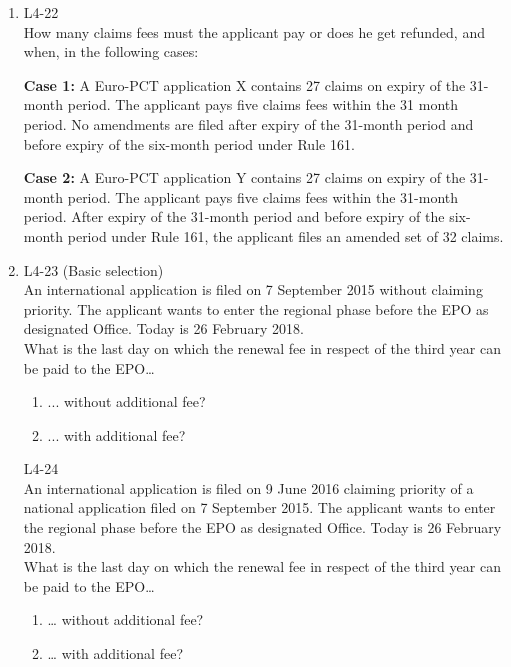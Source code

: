 \documentclass{report}
\begin{document}
\begin{enumerate}[label=\textbf{Answer \arabic*}]
\begin{enumerate}[label=\textbf{Answer \arabic*}]
    \item %
    L4-22 \\
    How many claims fees must the applicant pay or does he get refunded, and when, in the following cases:
    
    \vspace{1em}
    \textbf{Case 1:} A Euro-PCT application X contains 27 claims on expiry of the 31-month period. The applicant pays five claims fees within the 31 month period. No amendments are filed after expiry of the 31-month period and before expiry of the six-month period under Rule 161.
    
    \vspace{1em}
    \textbf{Case 2:} A Euro-PCT application Y contains 27 claims on expiry of the 31-month period. The applicant pays five claims fees within the 31-month period. After expiry of the 31-month period and before expiry of the six-month period under Rule 161, the applicant files an amended set of 32 claims.

    \item %
    L4-23 (Basic selection) \\
    An international application is filed on 7 September 2015 without claiming priority. The applicant wants to enter the regional phase before the EPO as designated Office. Today is 26 February 2018. \\
    What is the last day on which the renewal fee in respect of the third year can be paid to the EPO…
    \begin{enumerate}[label=(\alph*)]
        \item ... without additional fee?
        \item ... with additional fee?
    \end{enumerate}

    \vspace{1em}
    L4-24 \\
    An international application is filed on 9 June 2016 claiming priority of a national application filed on 7 September 2015. The applicant wants to enter the regional phase before the EPO as designated Office. Today is 26 February 2018. \\
    What is the last day on which the renewal fee in respect of the third year can be paid to the EPO…
    \begin{enumerate}[label=(\alph*), resume]
        \item … without additional fee?
        \item … with additional fee?
    \end{enumerate}


\end{enumerate}
\end{enumerate}
\end{document}
